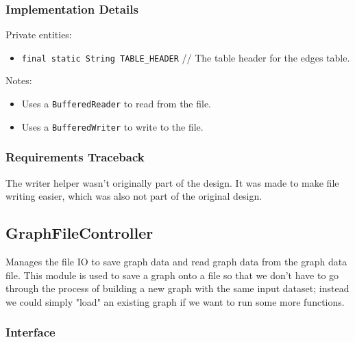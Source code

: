 \documentclass[12pt]{article}
\newcommand{\bi}{\begin{itemize}}
\newcommand{\ei}{\end{itemize}}
\newcommand{\code}[1]{\texttt{#1}}
\begin{document}
\subsubsection{Implementation Details}

Private entities:
\bi
    \item \code{final static String TABLE\_HEADER} // The table header for the edges table.
\ei

\noindent Notes:
\bi
	\item Uses a \code{BufferedReader} to read from the file.
	\item Uses a \code{BufferedWriter} to write to the file.
\ei

\subsubsection{Requirements Traceback}

The writer helper wasn't originally part of the design. It was made to make file writing easier, which was also not part of the original design.

\newpage

\subsection{GraphFileController}

Manages the file IO to save graph data and read graph data from the graph data file. This module is used to save a graph onto a file so that we don't have to go through the process of building a new graph with the same input dataset; instead we could simply "load" an existing graph if we want to run some more functions. 

\subsubsection{Interface}
\end{document}

